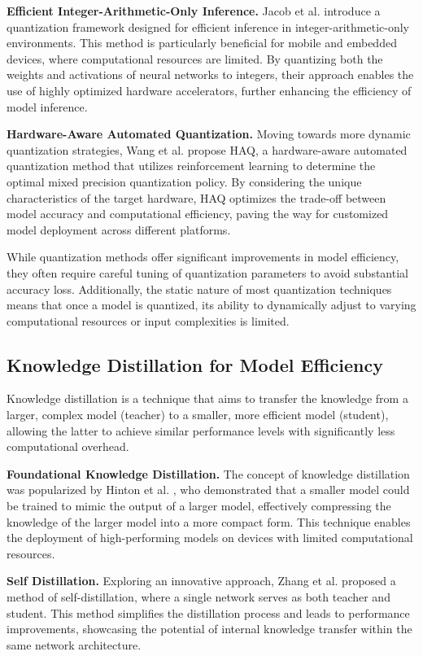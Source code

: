 \textbf{Efficient Integer-Arithmetic-Only Inference.} Jacob et al. \cite{jacob2018quantization} introduce a quantization framework designed for efficient inference in integer-arithmetic-only environments. This method is particularly beneficial for mobile and embedded devices, where computational resources are limited. By quantizing both the weights and activations of neural networks to integers, their approach enables the use of highly optimized hardware accelerators, further enhancing the efficiency of model inference.

\textbf{Hardware-Aware Automated Quantization.} Moving towards more dynamic quantization strategies, Wang et al. \cite{wang2019haq} propose HAQ, a hardware-aware automated quantization method that utilizes reinforcement learning to determine the optimal mixed precision quantization policy. By considering the unique characteristics of the target hardware, HAQ optimizes the trade-off between model accuracy and computational efficiency, paving the way for customized model deployment across different platforms.

While quantization methods offer significant improvements in model efficiency, they often require careful tuning of quantization parameters to avoid substantial accuracy loss. Additionally, the static nature of most quantization techniques means that once a model is quantized, its ability to dynamically adjust to varying computational resources or input complexities is limited.

\subsection{Knowledge Distillation for Model Efficiency}

Knowledge distillation is a technique that aims to transfer the knowledge from a larger, complex model (teacher) to a smaller, more efficient model (student), allowing the latter to achieve similar performance levels with significantly less computational overhead.

\textbf{Foundational Knowledge Distillation.} The concept of knowledge distillation was popularized by Hinton et al. \cite{hinton2015distilling}, who demonstrated that a smaller model could be trained to mimic the output of a larger model, effectively compressing the knowledge of the larger model into a more compact form. This technique enables the deployment of high-performing models on devices with limited computational resources.

\textbf{Self Distillation.} Exploring an innovative approach, Zhang et al. \cite{zhang2019your} proposed a method of self-distillation, where a single network serves as both teacher and student. This method simplifies the distillation process and leads to performance improvements, showcasing the potential of internal knowledge transfer within the same network architecture.

